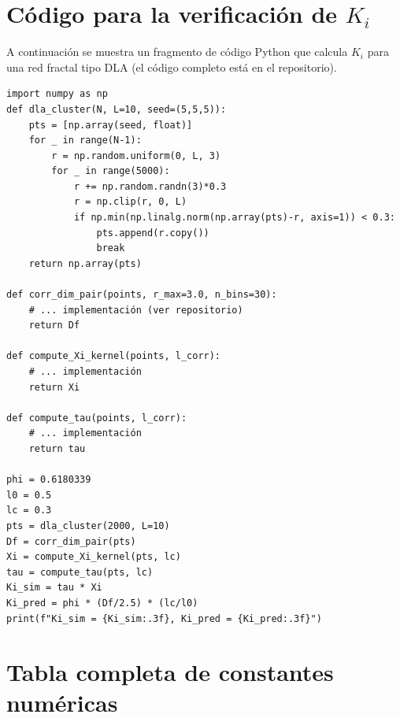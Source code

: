 \documentclass[12pt, a4paper]{article}
\theoremstyle{miuThm}
\theoremstyle{remark}
\begin{document}
\clearpage
\section{Código para la verificación de $K_i$}
\label{app:codigo_Ki}

A continuación se muestra un fragmento de código Python que calcula $K_i$ para una red fractal tipo DLA (el código completo está en el repositorio).

\begin{verbatim}
import numpy as np
def dla_cluster(N, L=10, seed=(5,5,5)):
    pts = [np.array(seed, float)]
    for _ in range(N-1):
        r = np.random.uniform(0, L, 3)
        for _ in range(5000):
            r += np.random.randn(3)*0.3
            r = np.clip(r, 0, L)
            if np.min(np.linalg.norm(np.array(pts)-r, axis=1)) < 0.3:
                pts.append(r.copy())
                break
    return np.array(pts)

def corr_dim_pair(points, r_max=3.0, n_bins=30):
    # ... implementación (ver repositorio)
    return Df

def compute_Xi_kernel(points, l_corr):
    # ... implementación
    return Xi

def compute_tau(points, l_corr):
    # ... implementación
    return tau

phi = 0.6180339
l0 = 0.5
lc = 0.3
pts = dla_cluster(2000, L=10)
Df = corr_dim_pair(pts)
Xi = compute_Xi_kernel(pts, lc)
tau = compute_tau(pts, lc)
Ki_sim = tau * Xi
Ki_pred = phi * (Df/2.5) * (lc/l0)
print(f"Ki_sim = {Ki_sim:.3f}, Ki_pred = {Ki_pred:.3f}")
\end{verbatim}

\clearpage
\section{Tabla completa de constantes numéricas}
\label{app:constantes}
\end{document}
